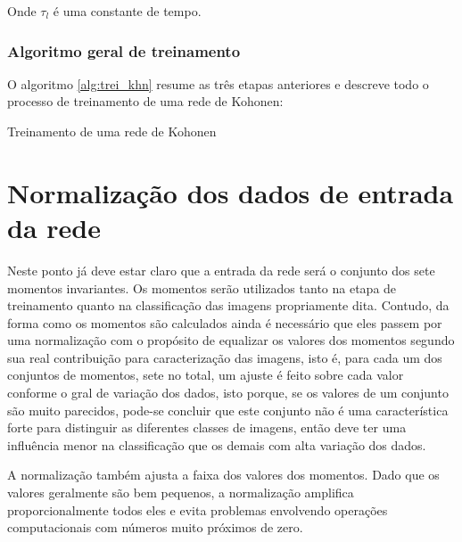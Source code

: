 Onde $ \tau_l $ é uma constante de tempo.

\subsubsection{Algoritmo geral de treinamento}

O algoritmo \ref{alg:trei_khn} resume as três etapas anteriores e descreve
todo o processo de treinamento de uma rede de Kohonen:

\begin{algorithm}[H]
\caption{Treinamento de uma rede de Kohonen}\label{alg:trei_khn}
\end{algorithm}

\section{Normalização dos dados de entrada da rede}\label{sec:entrada_rede}

Neste ponto já deve estar claro que a entrada da rede será o conjunto dos sete
momentos invariantes. Os momentos serão utilizados tanto na etapa de treinamento
quanto na classificação das imagens propriamente dita. Contudo, da forma como os
momentos são calculados ainda é necessário que eles passem por uma normalização
com o propósito de equalizar os valores dos momentos segundo sua real
contribuição para caracterização das imagens, isto é, para cada um dos conjuntos
de momentos, sete no total, um ajuste é feito sobre cada valor conforme o gral de
variação dos dados, isto porque, se os valores de um conjunto são muito
parecidos, pode-se concluir que este conjunto não é uma característica forte
para distinguir as diferentes classes de imagens, então deve ter uma influência
menor na classificação que os demais com alta variação dos dados.

A normalização também ajusta a faixa dos valores dos momentos. Dado que os
valores geralmente são bem pequenos, a normalização amplifica proporcionalmente
todos eles e evita problemas envolvendo operações computacionais com números
muito próximos de zero.

